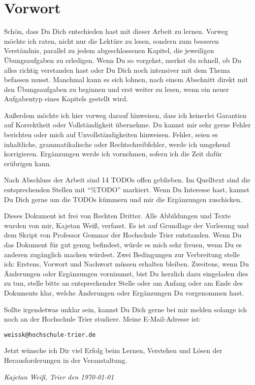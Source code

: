 \chapter*{Vorwort}
Schön, dass Du Dich entschieden hast mit dieser Arbeit zu lernen. Vorweg möchte ich raten, nicht nur die Lektüre zu lesen, sondern zum besseren Verständnis, parallel zu jedem abgeschlossenen Kapitel, die jeweiligen Übungsaufgaben zu erledigen. Wenn Du so vorgehst, merkst du schnell, ob Du alles richtig verstanden hast oder Du Dich noch intensiver mit dem Thema befassen musst. Manchmal kann es sich lohnen, nach einem Abschnitt direkt mit den Übungsaufgaben zu beginnen und erst weiter zu lesen, wenn ein neuer Aufgabentyp eines Kapitels gestellt wird.

Außerdem möchte ich hier vorweg darauf hinweisen, dass ich keinerlei Garantien auf Korrektheit oder Vollständigkeit übernehme. Du kannst mir sehr gerne Fehler berichten oder mich auf Unvollständigkeiten hinweisen. Fehler, seien es inhaltliche, grammatikalische oder Rechtschreibfehler, werde ich umgehend korrigieren. Ergänzungen werde ich vornehmen, sofern ich die Zeit dafür erübrigen kann.

Nach Abschluss der Arbeit sind 14 TODOs offen geblieben. Im Quelltext sind die entsprechenden Stellen mit "`\%TODO"' markiert. Wenn Du Interesse hast, kannst Du Dich gerne um die TODOs kümmern und mir die Ergänzungen zuschicken.

Dieses Dokument ist frei von Rechten Dritter. Alle Abbildungen und Texte wurden von mir, Kajetan Weiß, verfasst. Es ist auf Grundlage der Vorlesung und dem Skript von Professor Gemmar der Hochschule Trier entstanden. Wenn Du das Dokument für gut genug befindest, würde es mich sehr freuen, wenn Du es anderen zugänglich machen würdest. Zwei Bedingungen zur Verbreitung stelle ich: Erstens, Vorwort und Nachwort müssen erhalten bleiben. Zweitens, wenn Du Änderungen oder Ergänzungen vornimmst, bist Du herzlich dazu eingeladen dies zu tun, stelle bitte an entsprechender Stelle oder am Anfang oder am Ende des Dokuments klar, welche Änderungen oder Ergänzungen Du vorgenommen hast.

Sollte irgendetwas unklar sein, kannst Du Dich gerne bei mir melden solange ich noch an der Hochschule Trier studiere. Meine E-Mail-Adresse ist:
\begin{center}
	\texttt{weissk@hochschule-trier.de}
\end{center}

Jetzt wünsche ich Dir viel Erfolg beim Lernen, Verstehen und Lösen der Herausforderungen in der Veranstaltung.

\vspace{2cm}

\textsl{Kajetan Weiß, Trier den \today}